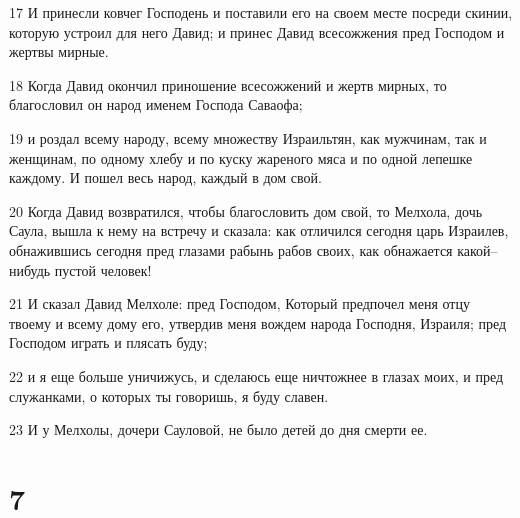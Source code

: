 \par 17 И принесли ковчег Господень и поставили его на своем месте посреди скинии, которую устроил для него Давид; и принес Давид всесожжения пред Господом и жертвы мирные.
\par 18 Когда Давид окончил приношение всесожжений и жертв мирных, то благословил он народ именем Господа Саваофа;
\par 19 и роздал всему народу, всему множеству Израильтян, как мужчинам, так и женщинам, по одному хлебу и по куску жареного мяса и по одной лепешке каждому. И пошел весь народ, каждый в дом свой.
\par 20 Когда Давид возвратился, чтобы благословить дом свой, то Мелхола, дочь Саула, вышла к нему на встречу и сказала: как отличился сегодня царь Израилев, обнажившись сегодня пред глазами рабынь рабов своих, как обнажается какой--нибудь пустой человек!
\par 21 И сказал Давид Мелхоле: пред Господом, Который предпочел меня отцу твоему и всему дому его, утвердив меня вождем народа Господня, Израиля; пред Господом играть и плясать буду;
\par 22 и я еще больше уничижусь, и сделаюсь еще ничтожнее в глазах моих, и пред служанками, о которых ты говоришь, я буду славен.
\par 23 И у Мелхолы, дочери Сауловой, не было детей до дня смерти ее.

\chapter{7}

